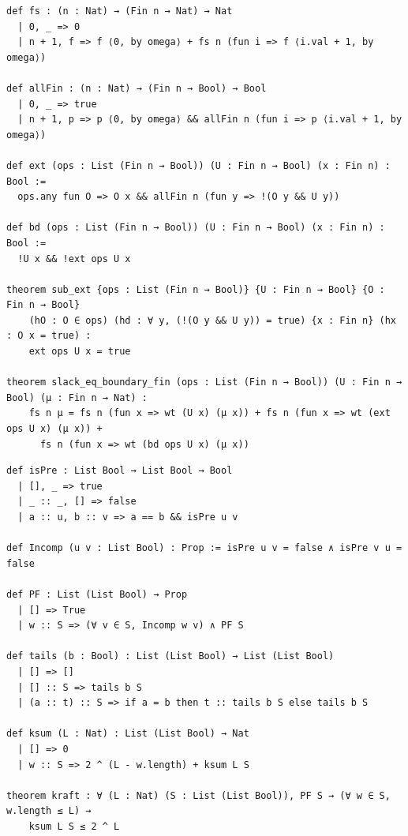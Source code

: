 \label{lean:constr-boundary}
\begin{lstlisting}
def fs : (n : Nat) → (Fin n → Nat) → Nat
  | 0, _ => 0
  | n + 1, f => f ⟨0, by omega⟩ + fs n (fun i => f ⟨i.val + 1, by omega⟩)

def allFin : (n : Nat) → (Fin n → Bool) → Bool
  | 0, _ => true
  | n + 1, p => p ⟨0, by omega⟩ && allFin n (fun i => p ⟨i.val + 1, by omega⟩)

def ext (ops : List (Fin n → Bool)) (U : Fin n → Bool) (x : Fin n) : Bool :=
  ops.any fun O => O x && allFin n (fun y => !(O y && U y))

def bd (ops : List (Fin n → Bool)) (U : Fin n → Bool) (x : Fin n) : Bool :=
  !U x && !ext ops U x

theorem sub_ext {ops : List (Fin n → Bool)} {U : Fin n → Bool} {O : Fin n → Bool}
    (hO : O ∈ ops) (hd : ∀ y, (!(O y && U y)) = true) {x : Fin n} (hx : O x = true) :
    ext ops U x = true

theorem slack_eq_boundary_fin (ops : List (Fin n → Bool)) (U : Fin n → Bool) (μ : Fin n → Nat) :
    fs n μ = fs n (fun x => wt (U x) (μ x)) + fs n (fun x => wt (ext ops U x) (μ x)) +
      fs n (fun x => wt (bd ops U x) (μ x))
\end{lstlisting}

\label{lean:constr-kraft}
\begin{lstlisting}
def isPre : List Bool → List Bool → Bool
  | [], _ => true
  | _ :: _, [] => false
  | a :: u, b :: v => a == b && isPre u v

def Incomp (u v : List Bool) : Prop := isPre u v = false ∧ isPre v u = false

def PF : List (List Bool) → Prop
  | [] => True
  | w :: S => (∀ v ∈ S, Incomp w v) ∧ PF S

def tails (b : Bool) : List (List Bool) → List (List Bool)
  | [] => []
  | [] :: S => tails b S
  | (a :: t) :: S => if a = b then t :: tails b S else tails b S

def ksum (L : Nat) : List (List Bool) → Nat
  | [] => 0
  | w :: S => 2 ^ (L - w.length) + ksum L S

theorem kraft : ∀ (L : Nat) (S : List (List Bool)), PF S → (∀ w ∈ S, w.length ≤ L) →
    ksum L S ≤ 2 ^ L
\end{lstlisting}

